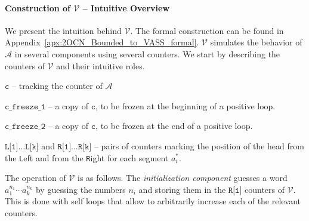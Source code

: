 \documentclass[USenglish]{lipics-v2021}
\newcommand{\vf}[1]{\texttt{#1}}
\newcommand{\cA}{\mathcal{A}}
\newcommand{\cV}{\mathcal{V}}
\begin{document}
\paragraph*{Construction of $\cV$ -- Intuitive Overview} 
We present the intuition behind $\cV$. The formal construction can be found in Appendix~\ref{apx:2OCN_Bounded_to_VASS_formal}.
$\cV$ simulates the behavior of $\cA$ in several components using several counters. We start by describing the counters of $\cV$ and their intuitive roles.
\begin{compactitem}
	\item $\vf{c}$ -- tracking the counter of $\cA$
	\item $\vf{c\_freeze\_1}$ -- a copy of $\vf{c}$, to be frozen at the
	beginning of a positive loop.
	\item $\vf{c\_freeze\_2}$ -- a copy of $\vf{c}$, to be frozen at the end of a
	positive loop.
	\item $\vf{L[1]}\ldots\vf{L[k]}$ and $\vf{R[1]}\ldots\vf{R[k]}$ --  pairs of counters
	marking the position of the head from the \vf{L}eft and from the \vf{R}ight
	for each segment \(a_i^*\).
\end{compactitem}
The operation of $\cV$ is as follows. 
The \emph{initialization component} guesses a word $a_1^{n_1}\cdots a_k^{n_k}$ by guessing the numbers $n_i$ and
storing them in the $\vf{R[i]}$ counters of $\cV$. This is done with self loops that allow to arbitrarily increase each of the relevant counters.
\end{document}

